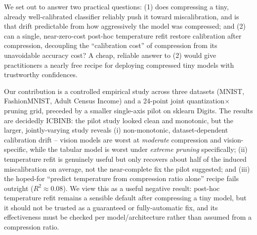 \documentclass{article} %
\theoremstyle{plain}
\theoremstyle{definition}
\theoremstyle{remark}
\begin{document}
We set out to answer two practical questions: (1) does compressing a tiny, already well-calibrated classifier reliably push it toward miscalibration, and is that drift predictable from how aggressively the model was compressed; and (2) can a single, near-zero-cost post-hoc temperature refit \citep{guo2017onco} restore calibration after compression, decoupling the ``calibration cost'' of compression from its unavoidable accuracy cost? A cheap, reliable answer to (2) would give practitioners a nearly free recipe for deploying compressed tiny models with trustworthy confidences.

Our contribution is a controlled empirical study across three datasets (MNIST, FashionMNIST, Adult Census Income) and a 24-point joint quantization$\times$pruning grid, preceded by a smaller single-axis pilot on sklearn Digits. The results are decidedly ICBINB: the pilot study looked clean and monotonic, but the larger, jointly-varying study reveals (i) non-monotonic, dataset-dependent calibration drift -- vision models are worst at \emph{moderate} compression and vision-specific, while the tabular model is worst under \emph{extreme pruning} specifically; (ii) temperature refit is genuinely useful but only recovers about half of the induced miscalibration on average, not the near-complete fix the pilot suggested; and (iii) the hoped-for ``predict temperature from compression ratio alone'' recipe fails outright ($R^2 \approx 0.08$). We view this as a useful negative result: post-hoc temperature refit remains a sensible default after compressing a tiny model, but it should not be trusted as a guaranteed or fully-automatic fix, and its effectiveness must be checked per model/architecture rather than assumed from a compression ratio.
\end{document}
